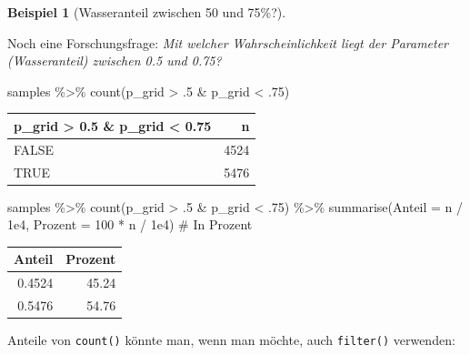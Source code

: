 \documentclass[
  a4paper,
  DIV=11]{scrreprt}
\newenvironment{Shaded}{\begin{snugshade}}{\end{snugshade}}
\newcommand{\AttributeTok}[1]{\textcolor[rgb]{0.40,0.45,0.13}{#1}}
\newcommand{\CommentTok}[1]{\textcolor[rgb]{0.37,0.37,0.37}{#1}}
\newcommand{\DecValTok}[1]{\textcolor[rgb]{0.68,0.00,0.00}{#1}}
\newcommand{\FloatTok}[1]{\textcolor[rgb]{0.68,0.00,0.00}{#1}}
\newcommand{\FunctionTok}[1]{\textcolor[rgb]{0.28,0.35,0.67}{#1}}
\newcommand{\NormalTok}[1]{\textcolor[rgb]{0.00,0.23,0.31}{#1}}
\newcommand{\SpecialCharTok}[1]{\textcolor[rgb]{0.37,0.37,0.37}{#1}}
\theoremstyle{definition}
\newtheorem{example}{Beispiel}[chapter]
\theoremstyle{remark}
\begin{document}
\leavevmode{}%
\begin{example}[Wasseranteil zwischen 50 und 75\%?]\label{exm-param2}

Noch eine Forschungsfrage: \emph{Mit welcher Wahrscheinlichkeit liegt
der Parameter (Wasseranteil) zwischen 0.5 und 0.75?}

\begin{Shaded}
\begin{Highlighting}[]
\NormalTok{samples }\SpecialCharTok{\%\textgreater{}\%} 
  \FunctionTok{count}\NormalTok{(p\_grid }\SpecialCharTok{\textgreater{}}\NormalTok{ .}\DecValTok{5} \SpecialCharTok{\&}\NormalTok{ p\_grid }\SpecialCharTok{\textless{}}\NormalTok{ .}\DecValTok{75}\NormalTok{)}
\end{Highlighting}
\end{Shaded}

\begin{longtable}[]{@{}lr@{}}
\toprule()
p\_grid \textgreater{} 0.5 \& p\_grid \textless{} 0.75 & n \\
\midrule()
\endhead
FALSE & 4524 \\
TRUE & 5476 \\
\bottomrule()
\end{longtable}

\begin{Shaded}
\begin{Highlighting}[]
\NormalTok{samples }\SpecialCharTok{\%\textgreater{}\%} 
  \FunctionTok{count}\NormalTok{(p\_grid }\SpecialCharTok{\textgreater{}}\NormalTok{ .}\DecValTok{5} \SpecialCharTok{\&}\NormalTok{ p\_grid }\SpecialCharTok{\textless{}}\NormalTok{ .}\DecValTok{75}\NormalTok{) }\SpecialCharTok{\%\textgreater{}\%} 
  \FunctionTok{summarise}\NormalTok{(}\AttributeTok{Anteil =}\NormalTok{ n }\SpecialCharTok{/} \FloatTok{1e4}\NormalTok{,}
            \AttributeTok{Prozent =} \DecValTok{100} \SpecialCharTok{*}\NormalTok{ n }\SpecialCharTok{/} \FloatTok{1e4}\NormalTok{)  }\CommentTok{\# In Prozent}
\end{Highlighting}
\end{Shaded}

\begin{longtable}[]{@{}rr@{}}
\toprule()
Anteil & Prozent \\
\midrule()
\endhead
0.4524 & 45.24 \\
0.5476 & 54.76 \\
\bottomrule()
\end{longtable}

Anteile von \texttt{count()} könnte man, wenn man möchte, auch
\texttt{filter()} verwenden:


\end{example}
\end{document}
